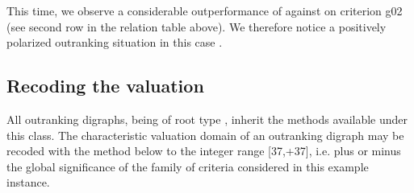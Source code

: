 \documentclass[a4paper,12pt,english]{sphinxhowto}
\begin{document}
\begin{sphinxVerbatim}[commandchars=\\\{\},numbers=left,firstnumber=1,stepnumber=1]
\end{sphinxVerbatim}

This time, we observe a considerable out\sphinxhyphen{}performance of  against  on criterion g02 (see second row in the relation table above). We therefore notice a positively polarized  outranking situation in this case .


\subsection{Recoding the valuation}
\label{\detokenize{tutorial:recoding-the-valuation}}
All outranking digraphs, being of root type , inherit the methods available under this class. The characteristic valuation domain of an outranking digraph may be recoded with the  method below to the integer range {[}\sphinxhyphen{}37,+37{]}, i.e. plus or minus the global significance of the family of criteria considered in this example instance.
\end{document}
